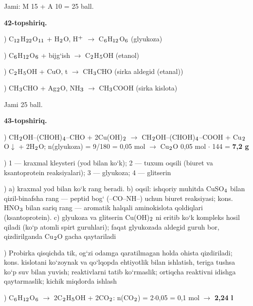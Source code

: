 \documentclass[11pt,a4paper]{article}
\renewcommand{\textsubscript}[1]{\ensuremath{_{\text{\fontsize{8}{8}\selectfont #1}}}}
\renewcommand{\textsuperscript}[1]{\ensuremath{^{\text{\fontsize{8}{8}\selectfont #1}}}}
\begin{document}
\noindent Jami: M 15 + A 10 = 25 ball.\par
\noindent\textbf{42-topshiriq.}\par
{}) C\textsubscript{12}H\textsubscript{22}O\textsubscript{11} + H\textsubscript{2}O, H\textsuperscript{+} $\to$ C\textsubscript{6}H\textsubscript{12}O\textsubscript{6} (glyukoza)\par
{}) C\textsubscript{6}H\textsubscript{12}O\textsubscript{6} + bijg`ish $\to$ C\textsubscript{2}H\textsubscript{5}OH (etanol)\par
{}) C\textsubscript{2}H\textsubscript{5}OH + CuO, t\textdegree{} $\to$ CH\textsubscript{3}CHO (sirka aldegid (etanal))\par
{}) CH\textsubscript{3}CHO + Ag\textsubscript{2}O, NH\textsubscript{3} $\to$ CH\textsubscript{3}COOH (sirka kislota)\par
\noindent Jami 25 ball.\par
\noindent\textbf{43-topshiriq.}\par
{}) CH\textsubscript{2}OH--(CHOH)\textsubscript{4}--CHO + 2Cu(OH)\textsubscript{2} $\to$ CH\textsubscript{2}OH--(CHOH)\textsubscript{4}--COOH + Cu\textsubscript{2}O$\downarrow$ + 2H\textsubscript{2}O; n(glyukoza) = 9/180 = 0,05 mol $\to$ Cu\textsubscript{2}O 0,05 mol $\cdot$ 144 = \textbf{7,2 g}\par
{}) 1 --- kraxmal kleysteri (yod bilan ko`k); 2 --- tuxum oqsili (biuret va ksantoprotein reaksiyalari); 3 --- glyukoza; 4 --- glitserin\par
{}) a) kraxmal yod bilan ko`k rang beradi. b) oqsil: ishqoriy muhitda CuSO\textsubscript{4} bilan qizil-binafsha rang --- peptid bog` (--CO--NH--) uchun biuret reaksiyasi; kons. HNO\textsubscript{3} bilan sariq rang --- aromatik halqali aminokislota qoldiqlari (ksantoprotein). c) glyukoza va glitserin Cu(OH)\textsubscript{2} ni eritib ko`k kompleks hosil qiladi (ko`p atomli spirt guruhlari); faqat glyukozada aldegid guruh bor, qizdirilganda Cu\textsubscript{2}O gacha qaytariladi\par
{}) Probirka qisqichda tik, og`zi odamga qaratilmagan holda ohista qizdiriladi; kons. kislotani ko`zoynak va qo`lqopda ehtiyotlik bilan ishlatish, teriga tushsa ko`p suv bilan yuvish; reaktivlarni tatib ko`rmaslik; ortiqcha reaktivni idishga qaytarmaslik; kichik miqdorda ishlash\par
{}) C\textsubscript{6}H\textsubscript{12}O\textsubscript{6} $\to$ 2C\textsubscript{2}H\textsubscript{5}OH + 2CO\textsubscript{2}: n(CO\textsubscript{2}) = 2$\cdot$0,05 = 0,1 mol $\to$ \textbf{2,24 l}\par
\end{document}
